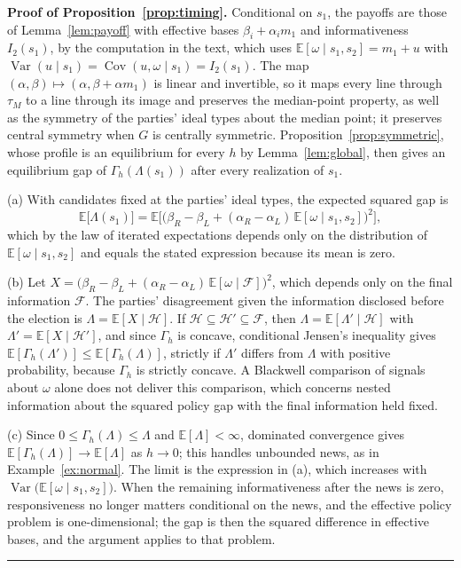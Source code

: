 \documentclass[12pt,letterpaper]{article}
\newenvironment{proof}[1][Proof]{\noindent\textbf{#1.} }{\ \rule{0.5em}{0.5em}}
\begin{document}
\begin{proof}[Proof of Proposition~\ref{prop:timing}]
Conditional on $s_1$, the payoffs are those of Lemma~\ref{lem:payoff} with effective bases $\beta_i+\alpha_im_1$ and informativeness $I_2(s_1)$, by the computation in the text, which uses $\mathbb{E}[\omega\mid s_1,s_2]=m_1+u$ with $\operatorname{Var}(u\mid s_1)=\operatorname{Cov}(u,\omega\mid s_1)=I_2(s_1)$. The map $(\alpha,\beta)\mapsto(\alpha,\beta+\alpha m_1)$ is linear and invertible, so it maps every line through $\tau_M$ to a line through its image and preserves the median-point property, as well as the symmetry of the parties' ideal types about the median point; it preserves central symmetry when $G$ is centrally symmetric. Proposition~\ref{prop:symmetric}, whose profile is an equilibrium for every $h$ by Lemma~\ref{lem:global}, then gives an equilibrium gap of $\Gamma_h(\Lambda(s_1))$ after every realization of $s_1$.

(a) With candidates fixed at the parties' ideal types, the expected squared gap is
\[
\mathbb{E}\big[\Lambda(s_1)\big]=\mathbb{E}\Big[\big(\beta_R-\beta_L+(\alpha_R-\alpha_L)\,\mathbb{E}[\omega\mid s_1,s_2]\big)^2\Big],
\]
which by the law of iterated expectations depends only on the distribution of $\mathbb{E}[\omega\mid s_1,s_2]$ and equals the stated expression because its mean is zero.

(b) Let $X=\big(\beta_R-\beta_L+(\alpha_R-\alpha_L)\,\mathbb{E}[\omega\mid\mathcal F]\big)^2$, which depends only on the final information $\mathcal F$. The parties' disagreement given the information disclosed before the election is $\Lambda=\mathbb{E}[X\mid\mathcal H]$. If $\mathcal H\subseteq\mathcal H'\subseteq\mathcal F$, then $\Lambda=\mathbb{E}[\Lambda'\mid\mathcal H]$ with $\Lambda'=\mathbb{E}[X\mid\mathcal H']$, and since $\Gamma_h$ is concave, conditional Jensen's inequality gives $\mathbb{E}[\Gamma_h(\Lambda')]\le\mathbb{E}[\Gamma_h(\Lambda)]$, strictly if $\Lambda'$ differs from $\Lambda$ with positive probability, because $\Gamma_h$ is strictly concave. A Blackwell comparison of signals about $\omega$ alone does not deliver this comparison, which concerns nested information about the squared policy gap with the final information held fixed.

(c) Since $0\le\Gamma_h(\Lambda)\le\Lambda$ and $\mathbb{E}[\Lambda]<\infty$, dominated convergence gives $\mathbb{E}[\Gamma_h(\Lambda)]\to\mathbb{E}[\Lambda]$ as $h\to0$; this handles unbounded news, as in Example~\ref{ex:normal}. The limit is the expression in (a), which increases with $\operatorname{Var}\big(\mathbb{E}[\omega\mid s_1,s_2]\big)$. When the remaining informativeness after the news is zero, responsiveness no longer matters conditional on the news, and the effective policy problem is one-dimensional; the gap is then the squared difference in effective bases, and the argument applies to that problem.
\end{proof}
\end{document}
